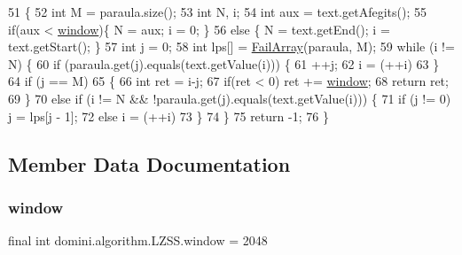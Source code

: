 \begin{DoxyCode}
51     \{
52         \textcolor{keywordtype}{int} M = paraula.size(); 
53         \textcolor{keywordtype}{int} N, i;
54         \textcolor{keywordtype}{int} aux = text.getAfegits();
55         \textcolor{keywordflow}{if}(aux < \hyperlink{classdomini_1_1algorithm_1_1LZSS_a00d9f2e9bc2baa39513fad040b8e7123}{window})\{ N = aux; i = 0; \}
56         \textcolor{keywordflow}{else} \{ N = text.getEnd(); i = text.getStart(); \}
57         \textcolor{keywordtype}{int} j = 0;
58         \textcolor{keywordtype}{int} lps[] = \hyperlink{classdomini_1_1algorithm_1_1LZSS_a56733a42f84d7a58cc5db9ea5f67835f}{FailArray}(paraula, M);
59         \textcolor{keywordflow}{while} (i != N) \{ 
60             \textcolor{keywordflow}{if} (paraula.get(j).equals(text.getValue(i))) \{ 
61                 ++j; 
62                 i = (++i)%
63             \} 
64             \textcolor{keywordflow}{if} (j == M)
65             \{
66                 \textcolor{keywordtype}{int} ret = i-j;
67                 \textcolor{keywordflow}{if}(ret < 0) ret += \hyperlink{classdomini_1_1algorithm_1_1LZSS_a00d9f2e9bc2baa39513fad040b8e7123}{window};
68                 \textcolor{keywordflow}{return} ret;
69             \}
70             \textcolor{keywordflow}{else} \textcolor{keywordflow}{if} (i != N && !paraula.get(j).equals(text.getValue(i))) \{ 
71                 \textcolor{keywordflow}{if} (j != 0) j = lps[j - 1]; 
72                 \textcolor{keywordflow}{else} i = (++i)%
73             \} 
74         \} 
75         \textcolor{keywordflow}{return} -1;
76     \} 
\end{DoxyCode}


\subsection{Member Data Documentation}
\mbox{\label{classdomini_1_1algorithm_1_1LZSS_a00d9f2e9bc2baa39513fad040b8e7123}} 
\subsubsection{\texorpdfstring{window}{window}}
{\footnotesize\ttfamily final int domini.\+algorithm.\+L\+Z\+S\+S.\+window = 2048\hspace{0.3cm}{\ttfamily [private]}}


